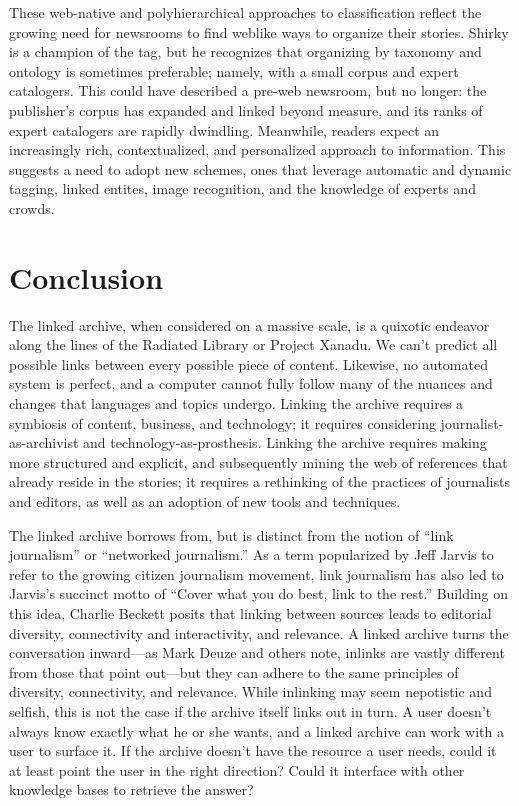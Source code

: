 These web-native and polyhierarchical approaches to classification reflect the growing need for newsrooms to find weblike ways to organize their stories. Shirky is a champion of the tag, but he recognizes that organizing by taxonomy and ontology is sometimes preferable; namely, with a small corpus and expert catalogers.\autocite{shirky_ontology_2005} This could have described a pre-web newsroom, but no longer: the publisher's corpus has expanded and linked beyond measure, and its ranks of expert catalogers are rapidly dwindling. Meanwhile, readers expect an increasingly rich, contextualized, and personalized approach to information. This suggests a need to adopt new schemes, ones that leverage automatic and dynamic tagging, linked entites, image recognition, and the knowledge of experts and crowds.

\section{Conclusion}

The linked archive, when considered on a massive scale, is a quixotic endeavor along the lines of the Radiated Library or Project Xanadu. We can't predict all possible links between every possible piece of content. Likewise, no automated system is perfect, and a computer cannot fully follow many of the nuances and changes that languages and topics undergo. Linking the archive requires a symbiosis of content, business, and technology; it requires considering journalist-as-archivist and technology-as-prosthesis. Linking the archive requires making more structured and explicit, and subsequently mining the web of references that already reside in the stories; it requires a rethinking of the practices of journalists and editors, as well as an adoption of new tools and techniques.

The linked archive borrows from, but is distinct from the notion of ``link journalism'' or ``networked journalism.'' As a term popularized by Jeff Jarvis to refer to the growing citizen journalism movement, link journalism has also led to Jarvis's succinct motto of ``Cover what you do best, link to the rest.''\autocite{jarvis_new_2007,jarvis_networked_2006} Building on this idea, Charlie Beckett posits that linking between sources leads to editorial diversity, connectivity and interactivity, and relevance.\autocite{beckett_editorial_2010} A linked archive turns the conversation inward---as Mark Deuze and others note, inlinks are vastly different from those that point out---but they can adhere to the same principles of diversity, connectivity, and relevance. While inlinking may seem nepotistic and selfish, this is not the case if the archive itself links out in turn.  A user doesn't always know exactly what he or she wants, and a linked archive can work with a user to surface it. If the archive doesn't have the resource a user needs, could it at least point the user in the right direction? Could it interface with other knowledge bases to retrieve the answer?

